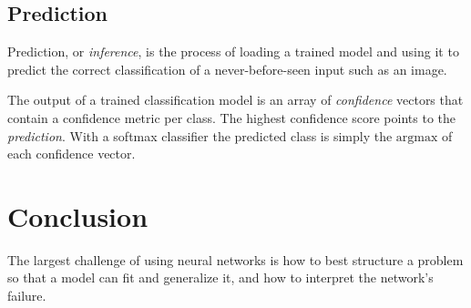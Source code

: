 \documentclass[a4paper]{article}
\begin{document}
\subsection*{Prediction}
Prediction, or \emph{inference}, is the process of loading a trained model and using it to predict the correct classification of a never-before-seen input such as an image.

The output of a trained classification model is an array of \emph{confidence} vectors that contain a confidence metric per class. The highest confidence score points to the \emph{prediction}. With a softmax classifier the predicted class is simply the $\text{argmax}$ of each confidence vector.

\section*{Conclusion}
The largest challenge of using neural networks is how to best structure a problem so that a model can fit and generalize it, and how to interpret the network's failure.
\end{document}
